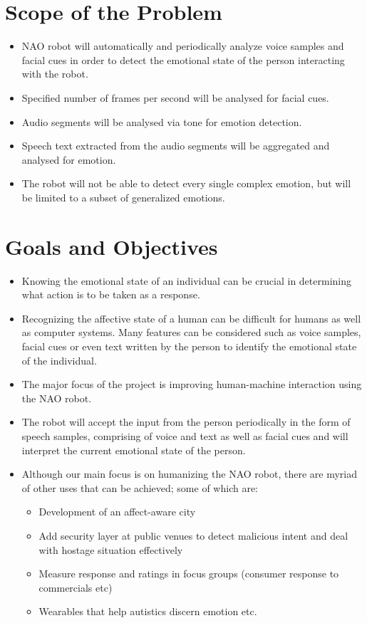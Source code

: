\documentclass[oneside,a4paper,12pt]{report}
\begin{document}
\begin{normalsize}
\section{Scope of the Problem}
\begin{itemize}
\item NAO robot will automatically and periodically analyze voice samples and facial cues in order to detect the emotional state of the person interacting with the robot.
\item Specified number of frames per second will be analysed for facial cues.
\item Audio segments will be analysed via tone for emotion detection.
\item Speech text extracted from the audio segments will be aggregated and analysed for emotion.
\item The robot will not be able to detect every single complex emotion, but will be limited to a subset of generalized emotions.

\end{itemize}

\newpage

\section{Goals and Objectives}
\begin{itemize}
	\item Knowing the emotional state of an individual can be crucial in determining what action is to be taken as a response.
	\item Recognizing the affective state of a human can be difficult for humans as well as computer systems. Many features can be considered such as voice samples, facial cues or even text written by the person to identify the emotional state of the individual.
	\item The major focus of the project is improving human-machine interaction using the NAO robot.
	\item The robot will accept the input from the person periodically in the form of speech samples, comprising of voice and text as well as facial cues and will interpret the current emotional state of the person.
	\item Although our main focus is on humanizing the NAO robot, there are myriad of other uses that can be achieved; some of which are:
	\begin{itemize}
		\item Development of an affect-aware city
		\item Add security layer at public venues to detect malicious intent and deal with hostage situation effectively
		\item Measure response and ratings in focus groups (consumer response to commercials etc)
		\item Wearables that help autistics discern emotion etc.
	\end{itemize}
\end{itemize}


\end{normalsize}
\end{document}

